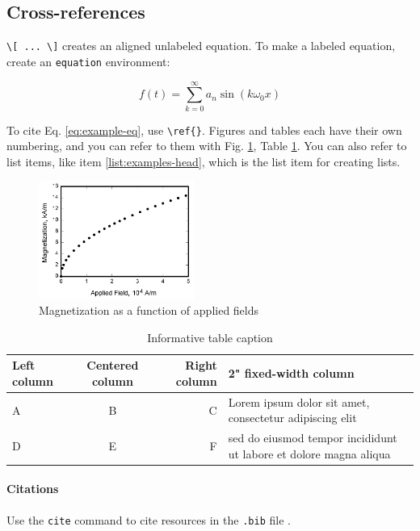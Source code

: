 \subsection*{Cross-references}

\verb|\[ ... \]| creates an aligned unlabeled equation. To make a labeled equation, create an \verb|equation| environment: 

\begin{equation} \label{eq:example-eq}
    f(t) = \sum_{k = 0}^{\infty} a_{n} \sin(k\omega_{0}x)
\end{equation}

To cite Eq. \ref{eq:example-eq}, use \verb|\ref{}|. Figures and tables each have
their own numbering, and you can refer to them with  Fig. \ref{fig:example-fig},
Table \ref{tbl:example-table}. You can also refer to list items, like item
\ref{list:examples-head}, which is the list item for creating lists.


\begin{figure}[H]
    \centering
    \includegraphics[width=2in]{fig/graph.jpg} %
    \caption{Magnetization as a function of applied fields} 
    \label{fig:example-fig} %
\end{figure}

\begin{table}[H]
    \centering
    \caption{Informative table caption}

    \begin{tabular}{|l|cr|p{2in}|} 

        \hline Left column & Centered column & Right column & 2" fixed-width
        column \\
        \hline A & B & C & Lorem ipsum dolor sit amet, consectetur adipiscing elit \\
        \hline D & E & F & sed do eiusmod tempor incididunt ut labore et
        dolore magna aliqua \\
        \hline %
    \end{tabular}	
    \label{tbl:example-table}
\end{table}	

\paragraph{Citations} Use the \verb|cite| command to cite resources in the
\verb|.bib| file \cite{peyret2012computational, oates1997aerothermodynamics}.